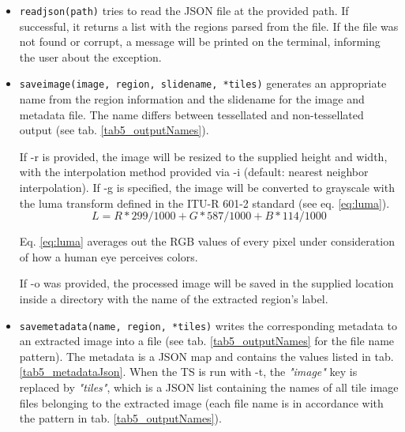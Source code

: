 \begin{itemize}
	\item \texttt{read{\textunderscore}json(path)} tries to read the JSON file at the provided path. If successful, it returns a list with the regions parsed from the file. If the file was not found or corrupt, a message will be printed on the terminal, informing the user about the exception.
\clearpage

	\item \texttt{save{\textunderscore}image(image, region, slide{\textunderscore}name, *tiles)} generates an appropriate name from the region information and the slide{\textunderscore}name for the image and metadata file. The name differs between tessellated and non-tessellated output (see tab. \ref{tab5_outputNames}).
	
	If -r is provided, the image will be resized to the supplied height and width, with the interpolation method provided via -i (default: nearest neighbor interpolation). If -g is specified, the image will be converted to grayscale with the luma transform defined in the ITU-R 601-2 standard\cite{ITUR94} (see eq. \ref{eq:luma}).
	\begin{equation}\label{eq:luma}
		L = R * 299/1000 + G * 587/1000 + B * 114/1000
	\end{equation}
	
	Eq. \ref{eq:luma} averages out the RGB values of every pixel under consideration of how a human eye perceives colors.
	
	If -o was provided, the processed image will be saved in the supplied location inside a directory with the name of the extracted region's label.
	
	\item \texttt{save{\textunderscore}metadata(name, region, *tiles)} writes the corresponding metadata to an extracted image into a file (see tab. \ref{tab5_outputNames} for the file name pattern). The metadata is a JSON map and contains the values listed in tab. \ref{tab5_metadataJson}. When the TS is run with -t, the \emph{"image"} key is replaced by \emph{"tiles"}, which is a JSON list containing the names of all tile image files belonging to the extracted image (each file name is in accordance with the pattern in tab. \ref{tab5_outputNames}).
	

\end{itemize}
